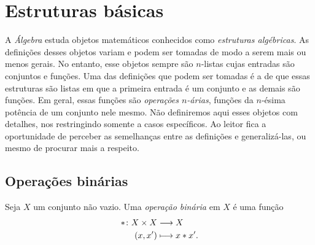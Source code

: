 
\chapter{Estruturas básicas}

A \emph{Álgebra} estuda objetos matemáticos conhecidos como \emph{estruturas algébricas}. As definições desses objetos variam e podem ser tomadas de modo a serem mais ou menos gerais. No entanto, esse objetos sempre são $n$-listas cujas entradas são conjuntos e funções. Uma das definições que podem ser tomadas é a de que essas estruturas são listas em que a primeira entrada é um conjunto e as demais são funções. Em geral, essas funções são \emph{operações $n$-árias}, funções da $n$-ésima potência de um conjunto nele mesmo. Não definiremos aqui esses objetos com detalhes, nos restringindo somente a casos específicos. Ao leitor fica a oportunidade de perceber as semelhanças entre as definições e generalizá-las, ou mesmo de procurar mais a respeito.

\section{Operações binárias}

\begin{definition}
Seja $X$ um conjunto não vazio. Uma \emph{operação binária} em $X$ é uma função
	\begin{align*}
	{\ast}\colon {X \times X} &\longrightarrow {X} \\{(x,x')} &\longmapsto x \ast x'.
	\end{align*}
\end{definition}

